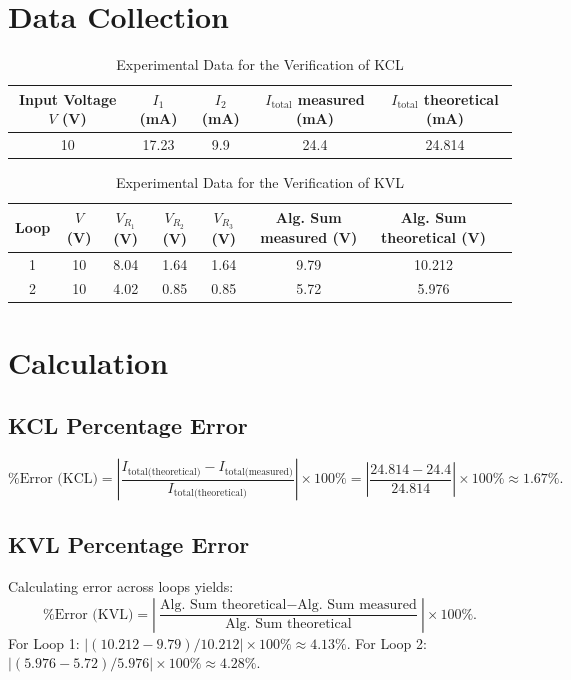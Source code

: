 \section{Data Collection}

\begin{table}[h!]
	\centering
	\caption{Experimental Data for the Verification of KCL}
	\vspace{2mm}
	\begin{tabular}{ccccc}
		\toprule
		\rowcolor{blue!10}
		\textbf{Input Voltage $V$ (V)} & \textbf{$I_1$ (mA)} & \textbf{$I_2$ (mA)} & \textbf{$I_{\text{total}}$ measured (mA)} & \textbf{$I_{\text{total}}$ theoretical (mA)} \\
		\midrule
		10 & 17.23 & 9.9 & 24.4 & 24.814 \\
		\bottomrule
	\end{tabular}
	\label{tab:kcldata}
\end{table}

\begin{table}[h!]
	\centering
	\caption{Experimental Data for the Verification of KVL}
	\vspace{2mm}
	\begin{tabular}{cccccccc}
		\toprule
		\rowcolor{blue!10}
		\textbf{Loop} & \textbf{$V$ (V)} & \textbf{$V_{R_1}$ (V)} & \textbf{$V_{R_2}$ (V)} & \textbf{$V_{R_3}$ (V)} & \textbf{Alg. Sum measured (V)} & \textbf{Alg. Sum theoretical (V)} \\
		\midrule
		1 & 10 & 8.04 & 1.64 & 1.64 & 9.79 & 10.212 \\
		2 & 10 & 4.02 & 0.85 & 0.85 & 5.72 & 5.976 \\
		\bottomrule
	\end{tabular}
	\label{tab:kvldata}
\end{table}

\section{Calculation}
\subsection{KCL Percentage Error}
\[
\text{\% Error (KCL)} = \left| \frac{I_{\text{total(theoretical)}} - I_{\text{total(measured)}}}{I_{\text{total(theoretical)}}} \right| \times 100\%
= \left| \frac{24.814 - 24.4}{24.814} \right| \times 100\% \approx 1.67\%.
\]

\subsection{KVL Percentage Error}
Calculating error across loops yields:
\[
\text{\% Error (KVL)} = \left| \frac{\text{Alg. Sum theoretical} - \text{Alg. Sum measured}}{\text{Alg. Sum theoretical}} \right| \times 100\%.
\]
For Loop 1: $\left|(10.212-9.79)/10.212\right|\times100\% \approx 4.13\%$. For Loop 2: $\left|(5.976-5.72)/5.976\right|\times100\% \approx 4.28\%$.

